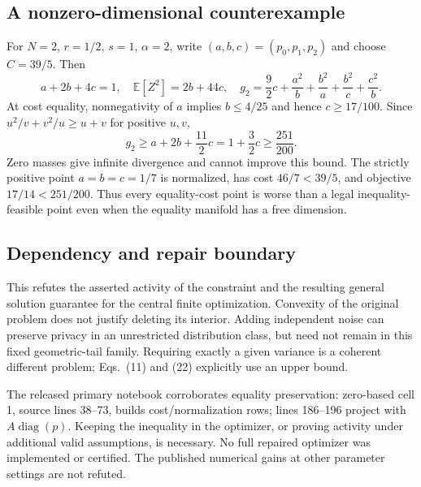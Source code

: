 \documentclass[10pt]{article}
\begin{document}
\subsection*{A nonzero-dimensional counterexample}
For \(N=2\), \(r=1/2\), \(s=1\), \(\alpha=2\), write \((a,b,c)=(p_0,p_1,p_2)\) and choose \(C=39/5\). Then \[a+2b+4c=1,\quad \mathbb E[Z^2]=2b+44c,\quad
g_2=\frac92c+\frac{a^2}{b}+\frac{b^2}{a}
                  +\frac{b^2}{c}+\frac{c^2}{b}.\] At cost equality, nonnegativity of \(a\) implies \(b\le4/25\) and hence \(c\ge17/100\). Since \(u^2/v+v^2/u\ge u+v\) for positive \(u,v\), \[g_2\ge a+2b+\frac{11}{2}c
=1+\frac32c\ge\frac{251}{200}.\] Zero masses give infinite divergence and cannot improve this bound. The strictly positive point \(a=b=c=1/7\) is normalized, has cost \(46/7<39/5\), and objective \(17/14<251/200\). Thus every equality-cost point is worse than a legal inequality-feasible point even when the equality manifold has a free dimension.\par
\subsection*{Dependency and repair boundary}
This refutes the asserted activity of the constraint and the resulting general solution guarantee for the central finite optimization. Convexity of the original problem does not justify deleting its interior. Adding independent noise can preserve privacy in an unrestricted distribution class, but need not remain in this fixed geometric-tail family. Requiring exactly a given variance is a coherent different problem; Eqs. (11) and (22) explicitly use an upper bound.\par
The released primary notebook corroborates equality preservation: zero-based cell 1, source lines 38–73, builds cost/normalization rows; lines 186–196 project with \(A\operatorname{diag}(p)\). Keeping the inequality in the optimizer, or proving activity under additional valid assumptions, is necessary. No full repaired optimizer was implemented or certified. The published numerical gains at other parameter settings are not refuted.\par
\end{document}
